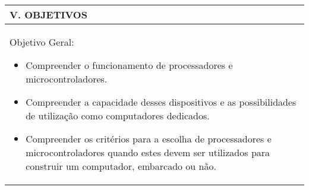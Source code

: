 \documentclass[12pt]{article}
\begin{document}
\begin{longtable}{|L{1.025\textwidth}|} \hline
%
{\bf V. OBJETIVOS } \\ \hline
%
Objetivo Geral:
\begin{itemize}
\item Compreender o funcionamento de processadores e microcontroladores. 
\item Compreender a capacidade desses dispositivos e as possibilidades de utilização como computadores dedicados.
\item Compreender os critérios para a escolha de processadores e microcontroladores quando estes devem ser utilizados para construir um computador, embarcado ou não.
\end{itemize}

\\ \hline
\end{longtable}
\end{document}

